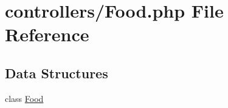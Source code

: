 \hypertarget{_food_8php}{}\section{controllers/\+Food.php File Reference}
\label{_food_8php}
\subsection*{Data Structures}
\begin{DoxyCompactItemize}
\item 
class \mbox{\hyperlink{class_food}{Food}}
\end{DoxyCompactItemize}
